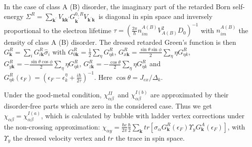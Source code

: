 \documentclass
[aps,pra,amsfonts,amssymb,twocolumn,amsmath,preprintnumbers,nofootinbib,floatfix,
showpacs,superscriptaddress]{revtex4-1}%
\begin{document}
In the case of class A (B) disorder, the imaginary part of the retarded Born
self-energy $\Sigma^{R}=\sum_{\mathbf{k}^{\prime}}V_{\mathbf{kk}^{\prime}%
}G_{\mathbf{k}^{\prime}}^{0,R}V_{\mathbf{k}^{\prime}\mathbf{k}}$\ is diagonal
in spin space and inversely proportional to the electron lifetime
$\tau=\left(  \frac{2\pi}{\hbar}n_{im}^{A\left(  B\right)  }V_{A\left(
B\right)  }^{2}D_{0}\right)  ^{-1}$ with $n_{im}^{A\left(  B\right)  }$ the
density of class A (B) disorder. The dressed retarded Green's function is then
\cite{Nunner2007} $G_{\mathbf{k}}^{R}=\sum_{i}G_{i\mathbf{k}}^{R}\hat{\sigma
}_{i}$ with $G_{0\mathbf{k}}^{R}=\frac{1}{2}\sum_{\eta}G_{\eta k}^{R}$,
$G_{x\mathbf{k}}^{R}=\frac{\sin\theta\sin\phi}{2}\sum_{\eta}\eta G_{\eta
k}^{R}$, $G_{y\mathbf{k}}^{R}=-\frac{\sin\theta\cos\phi}{2}\sum_{\eta}\eta
G_{\eta k}^{R}$, $G_{z\mathbf{k}}^{R}=-\frac{\cos\theta}{2}\sum_{\eta}\eta
G_{\eta k}^{R}$ and $G_{\eta k}^{R}\left(  \epsilon_{F}\right)  =\left(
\epsilon_{F}-\epsilon_{k}^{\eta}+\frac{i\hbar}{2\tau}\right)  ^{-1}$. Here
$\cos\theta=J_{ex}/\Delta_{k}$.

Under the good-metal condition, $\chi_{\alpha\beta}^{II}$\ and $\chi
_{\alpha\beta}^{I\left(  b\right)  }$ are approximated by their disorder-free
parts \cite{Nunner2007,noteSea} which are zero in the considered case. Thus we
get $\chi_{\alpha\beta}=\chi_{\alpha\beta}^{I\left(  a\right)  }$, which is
calculated by bubble with ladder vertex corrections \cite{Liu2011,Burkov2004}
under the non-crossing approximation: $\chi_{\alpha y}=\frac{\hbar e}{2\pi
}\frac{\hbar}{2}\sum_{\mathbf{k}}tr\left[  \sigma_{\alpha}G_{\mathbf{k}}%
^{R}\left(  \epsilon_{F}\right)  \Upsilon_{y}G_{\mathbf{k}}^{A}\left(
\epsilon_{F}\right)  \right]  $, with $\Upsilon_{y}$ the dressed velocity
vertex and $tr$ the trace in spin space.
\end{document}
